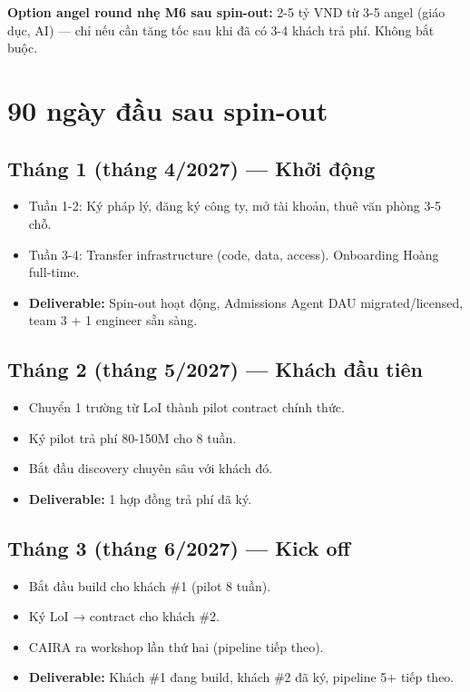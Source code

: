 \documentclass[11pt,a4paper]{article}
\begin{document}
\textbf{Option angel round nhẹ M6 sau spin-out:} 2-5 tỷ VND từ 3-5 angel (giáo
dục, AI) --- chỉ nếu cần tăng tốc sau khi đã có 3-4 khách trả phí. Không bắt
buộc.

\clearpage

\section{90 ngày đầu sau spin-out}

\subsection{Tháng 1 (tháng 4/2027) — Khởi động}

\begin{itemize}
\item Tuần 1-2: Ký pháp lý, đăng ký công ty, mở tài khoản, thuê văn phòng 3-5 chỗ.
\item Tuần 3-4: Transfer infrastructure (code, data, access). Onboarding Hoàng full-time.
\item \textbf{Deliverable:} Spin-out hoạt động, Admissions Agent DAU migrated/licensed, team 3 + 1 engineer sẵn sàng.
\end{itemize}

\subsection{Tháng 2 (tháng 5/2027) — Khách đầu tiên}

\begin{itemize}
\item Chuyển 1 trường từ LoI thành pilot contract chính thức.
\item Ký pilot trả phí 80-150M cho 8 tuần.
\item Bắt đầu discovery chuyên sâu với khách đó.
\item \textbf{Deliverable:} 1 hợp đồng trả phí đã ký.
\end{itemize}

\subsection{Tháng 3 (tháng 6/2027) — Kick off}

\begin{itemize}
\item Bắt đầu build cho khách \#1 (pilot 8 tuần).
\item Ký LoI → contract cho khách \#2.
\item CAIRA ra workshop lần thứ hai (pipeline tiếp theo).
\item \textbf{Deliverable:} Khách \#1 đang build, khách \#2 đã ký, pipeline 5+ tiếp theo.
\end{itemize}
\end{document}
